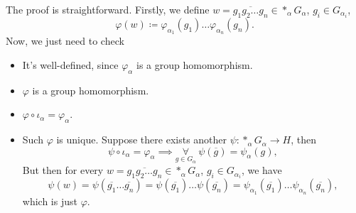 \begin{explanation}
	The proof is straightforward. Firstly, we define \(w = \overline{g_1 g_2\dots g_n}\in \ast_\alpha G_\alpha\), \(g_{i} \in G_{\alpha_{i} } \),
	\[
		\varphi (w)\coloneqq \varphi _{\alpha _1}(g_1)\dots \varphi _{\alpha _{n} }(g_{n} ).
	\]
	Now, we just need to check
	\begin{itemize}
		\item It's well-defined, since \(\varphi_\alpha \) is a group homomorphism.
		\item \(\varphi \) is a group homomorphism.
		\item \(\varphi \circ \iota _\alpha =\varphi _\alpha \).
		\item Such \(\varphi \) is unique. Suppose there exists another \(\psi \colon \ast_\alpha G_\alpha \to H\), then
		      \[
			      \psi \circ \iota _\alpha = \varphi _\alpha \implies \underset{g\in G_\alpha }{\forall }\ \psi (\overline{g} )= \psi _\alpha (g),
		      \]
		      But then for every \(w = \overline{g_1 g_2\dots g_n}\in \ast_\alpha G_\alpha\), \(g_{i} \in G_{\alpha_{i} } \), we have
		      \[
			      \psi (w) = \psi (\overline{g_1}\dots \overline{g_n}) = \psi (\overline{g_1}) \dots \psi (\overline{g_n})  = \psi _{\alpha _1}(\overline{g_1}) \dots \psi _{\alpha_n}(\overline{g_n}),
		      \]
		      which is just \(\varphi \).
	\end{itemize}
\end{explanation}

